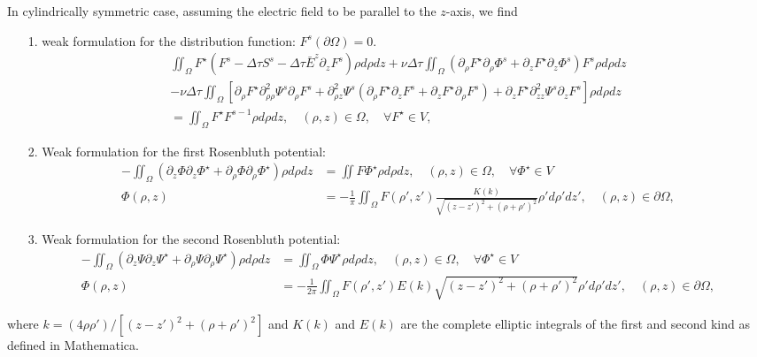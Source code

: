 \documentclass[preprint]{revtex4}
\begin{document}
In cylindrically symmetric case, assuming the electric field to be parallel to the $z$-axis, we find
\begin{itemize}
\item[1.] weak formulation for the distribution function: $F^s(\partial\Omega)=0$.
\begin{multline}
\iint_{\Omega}F^{\star}\left(F^s -\Delta\tau S^s-\Delta\tau\bar{E}^z\partial_z F^s\right)\rho d\rho dz
+\nu\Delta\tau\iint_{\Omega}\left(\partial_{\rho}F^{\star}\partial_{\rho}\Phi^s+\partial_{z}F^{\star}\partial_{z}\Phi^s\right) F^s\rho d\rho dz\\
-\nu\Delta\tau\iint_{\Omega}\left[\partial_{\rho}F^{\star}\partial^2_{\rho\rho}\Psi^s\partial_{\rho} F^s+\partial^2_{\rho z}\Psi^s\left(\partial_{\rho}F^{\star}\partial_{z} F^s+\partial_{z}F^{\star}\partial_{\rho} F^s\right)+\partial_{z}F^{\star}\partial^2_{zz}\Psi^s\partial_{z} F^s\right] \rho d\rho dz\\
=\iint_{\Omega}F^{\star}F^{s-1}\rho d\rho dz, \quad (\rho,z)\in\Omega, \quad \forall F^{\star}\in V,
\end{multline}
\item[2.] Weak formulation for the first Rosenbluth potential:
\begin{align}
-\iint_{\Omega} \left(\partial_z\Phi\partial_z\Phi^{\star}+\partial_{\rho}\Phi\partial_{\rho}\Phi^{\star}\right)\rho d\rho dz&=\iint F\Phi^{\star} \rho d\rho dz, \quad (\rho,z)\in\Omega, \quad \forall \Phi^{\star}\in V\\
 \Phi(\rho,z)&=-\frac{1}{\pi}\iint_{\Omega} F(\rho',z')\frac{K(k)}{\sqrt{(z-z')^2+(\rho+\rho')^2}}\rho'd\rho'dz', \quad (\rho,z)\in\partial\Omega,
\end{align}
\item[3.] Weak formulation for the second Rosenbluth potential:
\begin{align}
-\iint_{\Omega} \left(\partial_z\Psi\partial_z\Psi^{\star}+\partial_{\rho}\Psi\partial_{\rho}\Psi^{\star}\right)\rho d\rho dz&=\iint_{\Omega} \Phi\Psi^{\star} \rho d\rho dz, \quad (\rho,z)\in\Omega, \quad \forall \Phi^{\star}\in V\\
 \Phi(\rho,z)&=-\frac{1}{2\pi}\iint_{\Omega} F(\rho',z')E(k)\sqrt{(z-z')^2+(\rho+\rho')^2}\rho'd\rho'dz', \quad (\rho,z)\in\partial\Omega,
\end{align}
\end{itemize}
where $k=(4\rho\rho')/[(z-z')^2+(\rho+\rho')^2]$ and $K(k)$ and $E(k)$ are the complete elliptic integrals of the first and second kind as defined in Mathematica.
\end{document}
